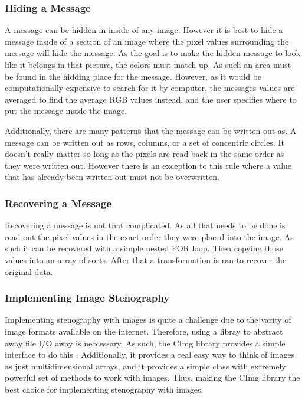 \documentclass[12pt]{article}
\begin{document}
    \subsubsection{Hiding a Message}
      A message can be hidden in inside of any image. However it is best 
      to hide a message inside of a section of an image where the pixel
      values surrounding the message will hide the message. As the goal
      is to make the hidden message to look like it belongs in that
      picture, the colors must match up. As such an area must be found
      in the hidding place for the message. However, as it would be
      computationally expensive to search for it by computer, the
      messages values are averaged to find the average RGB values 
      instead, and the user specifies where to put the message 
      inside the image.
      
      Additionally, there are many patterns that the message can be
      written out as. A message can be written out as rows, columns,
      or a set of concentric circles. It doesn't really matter so long
      as the pixels are read back in the same order as they were
      written out. However there is an exception to this rule where
      a value that has already been written out must not be overwritten.
          
    \subsubsection{Recovering a Message}    
      Recovering a message is not that complicated. As all that needs
      to be done is read out the pixel values in the exact order they
      were placed into the image. As such it can be recovered with a
      simple nested FOR loop. Then copying those values into an array
      of sorts. After that a transformation is ran to recover the
      original data.

    \subsubsection{Implementing Image Stenography}
      Implementing stenography with images is quite a challenge due to
      the varity of image formats available on the internet. Therefore,
      using a libray to abstract away file I/O away is neccessary.  As
      such, the CImg library provides a simple interface to do this
      \cite{cimg}. Additionally, it provides a real easy way to think of
      images as just multidimensional arrays, and it provides a simple
      class with extremely powerful set of methods to work with images.
      Thus, making the CImg library the best choice for implementing 
      stenography with images.

            


\end{document}
